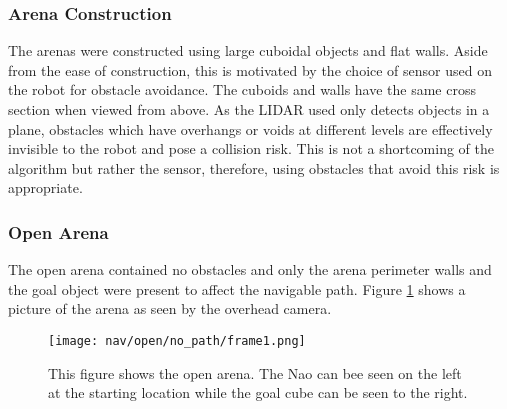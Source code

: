 \subsubsection{Arena Construction}
The arenas were constructed using large cuboidal objects and flat walls. Aside from the ease of
construction, this is motivated by the choice of sensor used on the robot for obstacle avoidance.
The cuboids and walls have the same cross section when viewed from above. As the LIDAR used
only detects objects in a plane, obstacles which have overhangs or voids at different levels
are effectively invisible to the robot and pose a collision risk. This is not a shortcoming of
the algorithm but rather the sensor, therefore, using obstacles that avoid this risk is appropriate.


\subsubsection{Open Arena}
The open arena contained no obstacles and only the arena perimeter walls and the goal
object were present to affect the navigable path.
Figure \ref{fig:nav_open_setup1} shows a picture of the arena as seen by the overhead camera.

\begin{figure}
  \texttt{[image: nav/open/no\_path/frame1.png]}
  \caption{This figure shows the open arena. The Nao can bee seen on the left at the starting location
           while the goal cube can be seen to the right.
           }
  \label{fig:nav_open_setup1}
\end{figure}

